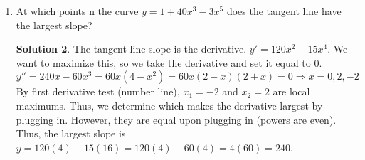 \documentclass[10pt]{article}
\theoremstyle{Theorem}
\theoremstyle{definition}
\newtheorem*{solution}{Solution}
\theoremstyle{remark}
\theoremstyle{custom}
\begin{document}
\begin{enumerate}[1.]
\begin{solution}
\end{solution}
\item At which points n the curve $y=1+40x^3-3x^5$ does the tangent line have the largest slope?
\begin{solution}
The tangent line slope is the derivative. $y'=120x^2-15x^4$. We want to maximize this, so we take the derivative and set it equal to 0. 
\[
y''=240x-60x^3=60x(4-x^2)=60x(2-x)(2+x)=0 \Rightarrow x=0,2,-2
\]
By first derivative test (number line), $x_1=-2$ and $x_2=2$ are local maximums. Thus, we determine which makes the derivative largest by plugging in. However, they are equal upon plugging in (powers are even). Thus, the largest slope is $y=120(4)-15(16)=120(4)-60(4)=4(60)=240$.
\end{solution}
\end{enumerate}
\end{document}

